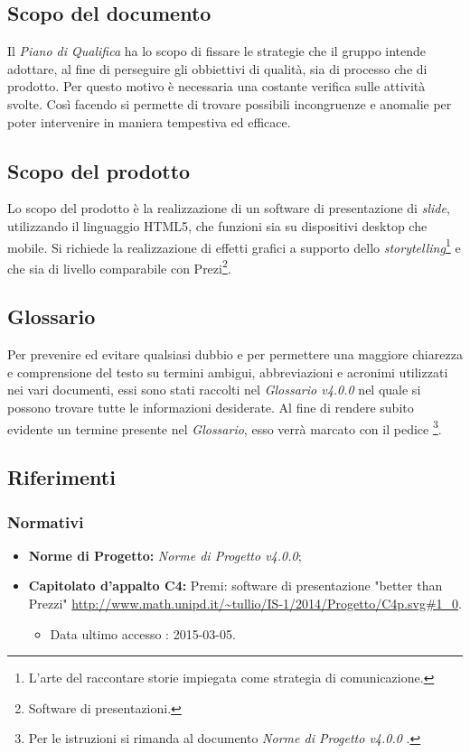 \subsection{Scopo del documento}
Il \textit{Piano di Qualifica} ha lo scopo di fissare le strategie che il gruppo intende adottare, al fine di perseguire gli obbiettivi di qualità, sia di processo che di prodotto. Per questo motivo è necessaria una costante verifica sulle attività svolte. Così facendo si permette di trovare possibili incongruenze e anomalie per poter intervenire in maniera tempestiva ed efficace.
\subsection{Scopo del prodotto}
Lo scopo del prodotto è la realizzazione di un software di presentazione di \textit{\gls{slide}}, utilizzando il linguaggio \gls{HTML5}, che funzioni sia su dispositivi desktop che mobile. Si richiede la realizzazione di effetti grafici a supporto dello \textit{storytelling}\footnote{L'arte del raccontare storie impiegata come strategia di comunicazione.} e che sia di livello comparabile con Prezi\footnote{Software di presentazioni.}.
\subsection{Glossario}
Per prevenire ed evitare qualsiasi dubbio e per permettere una maggiore chiarezza e comprensione del testo su termini ambigui, abbreviazioni e acronimi utilizzati nei vari documenti, essi sono stati raccolti nel \textit{Glossario v4.0.0} nel quale si possono trovare tutte le informazioni desiderate.
Al fine di rendere subito evidente un termine presente nel \textit{Glossario}, esso verrà marcato con il pedice \G\footnote{Per le istruzioni si rimanda al documento \textit{Norme di Progetto v4.0.0} .}.
\subsection{Riferimenti}
	\subsubsection{Normativi}
	\begin{itemize}
		\item \textbf{Norme di Progetto:} \textit{Norme di Progetto v4.0.0};
		\item \textbf{Capitolato d'appalto C4:} Premi: software di presentazione "better than Prezzi" \url{http://www.math.unipd.it/~tullio/IS-1/2014/Progetto/C4p.svg#1_0}.
		\begin{itemize}
			\item Data ultimo accesso : 2015-03-05.						
		\end{itemize}
	\end{itemize}
